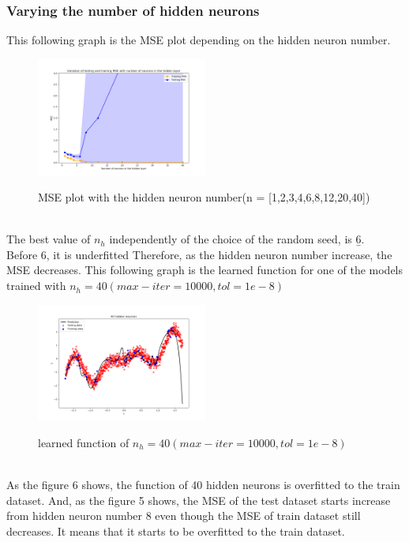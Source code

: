 \documentclass[a4paper]{article}
\begin{document}
\subsubsection{Varying the number of hidden neurons}
This following graph is the MSE plot depending on the hidden neuron number.\\
\begin{figure}[h]
\includegraphics[width=0.5\textwidth]{ex_1_1_c.png}\\
\caption{MSE plot with the hidden neuron number(n = [1,2,3,4,6,8,12,20,40])}
\end{figure}\\
The best value of $n_h$ independently of the choice of the random seed, is \b 6.\\
Before 6, it is underfitted Therefore, as the hidden neuron number increase, the MSE decreases.
This following graph is the learned function for one of the models trained with $n_h = 40 (max-iter=10000, tol=1e-8)$\\
\begin{figure}[h]
\includegraphics[width=0.5\textwidth]{ex_1_1_c_40.png}\\
\caption{learned function of $n_h = 40 (max-iter=10000, tol=1e-8)$}
\end{figure}\\
As the figure 6 shows, the function of 40 hidden neurons is overfitted to the train dataset. And, as the figure 5 shows, the MSE of the test dataset starts increase from hidden neuron number 8 even though the MSE of train dataset still decreases. It means that it starts to be overfitted to the train dataset.\\
\clearpage
\end{document}
